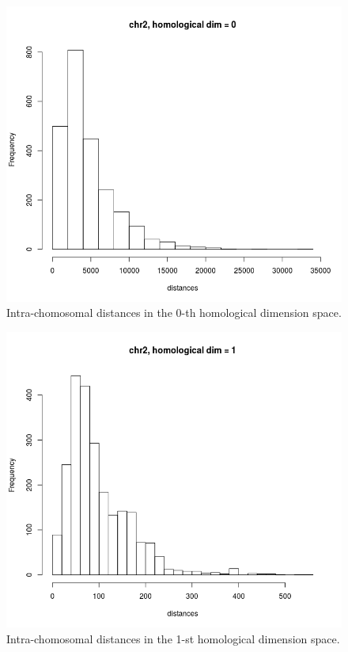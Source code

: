 \documentclass[12pt,a4paper]{article}
\begin{document}
\begin{figure}[hbtp]
\centering
\includegraphics[scale=0.75]{2wd_chr2_dim0_69clouds.png}
\caption{Intra-chomosomal distances in the 0-th homological dimension space.}
\label{fig:dist_0d_intra_chr2}
\end{figure}
\begin{figure}[hbtp]
\centering
\includegraphics[scale=0.75]{2wd_chr2_dim1_69clouds.png}
\caption{Intra-chomosomal distances in the 1-st homological dimension space.}
\label{fig:dist_1d_intra_chr2}
\end{figure}
\end{document}
